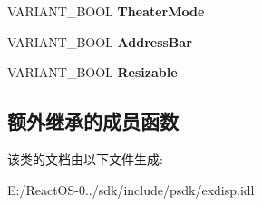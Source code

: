 \begin{DoxyCompactItemize}
\item 
\mbox{\label{interface_s_h_doc_vw_1_1uuid_a03fd21f35b544d703e419ae4d450f0b2}} 
V\+A\+R\+I\+A\+N\+T\+\_\+\+B\+O\+OL {\bfseries Theater\+Mode}
\item 
\mbox{\label{interface_s_h_doc_vw_1_1uuid_aa8e45761bdb2a9490d4314e25ad39396}} 
V\+A\+R\+I\+A\+N\+T\+\_\+\+B\+O\+OL {\bfseries Address\+Bar}
\item 
\mbox{\label{interface_s_h_doc_vw_1_1uuid_a762eb31e70f0c48837aba7dc0645c409}} 
V\+A\+R\+I\+A\+N\+T\+\_\+\+B\+O\+OL {\bfseries Resizable}
\end{DoxyCompactItemize}
\subsection*{额外继承的成员函数}


该类的文档由以下文件生成\+:\begin{DoxyCompactItemize}
\item 
E\+:/\+React\+O\+S-\/0../sdk/include/psdk/exdisp.\+idl\end{DoxyCompactItemize}

